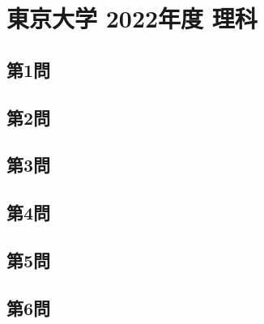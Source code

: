 ﻿\documentclass[../../uem_tok_q.tex]{subfiles}
\begin{document}
    \section{東京大学 2022年度 理科}

    \subsection{第1問}
    

    \vfill
    \subsection{第2問}
    

    \vfill
    \newpage
    \subsection{第3問}
    

    \vfill
    \subsection{第4問}
    

    \vfill
    \newpage
    \subsection{第5問}
    

    \vfill
    \subsection{第6問}
    

    \vfill
\end{document}
